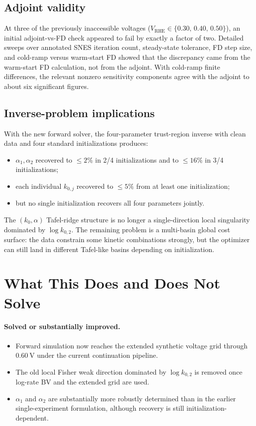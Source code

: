 \documentclass[11pt]{article}
\newcommand{\VRHE}{V_{\mathrm{RHE}}}
\begin{document}
\subsection*{Adjoint validity}
At three of the previously inaccessible voltages ($\VRHE \in
\{0.30,\,0.40,\,0.50\}$), an initial adjoint-vs-FD check appeared to fail by
exactly a factor of two. Detailed sweeps over annotated SNES iteration count,
steady-state tolerance, FD step size, and cold-ramp versus warm-start FD showed
that the discrepancy came from the warm-start FD calculation, not from the
adjoint. With cold-ramp finite differences, the relevant nonzero sensitivity
components agree with the adjoint to about six significant figures.

\subsection*{Inverse-problem implications}
With the new forward solver, the four-parameter trust-region inverse with
clean data and four standard initializations produces:
\begin{itemize}
  \item $\alpha_1, \alpha_2$ recovered to $\le 2\%$ in 2/4 initializations and
        to $\le 16\%$ in 3/4 initializations;
  \item each individual $k_{0,j}$ recovered to $\le 5\%$ from at least one
        initialization;
  \item but no single initialization recovers all four parameters jointly.
\end{itemize}
The $(k_0,\alpha)$ Tafel-ridge structure is no longer a single-direction local
singularity dominated by $\log k_{0,2}$. The remaining problem is a multi-basin
global cost surface: the data constrain some kinetic combinations strongly,
but the optimizer can still land in different Tafel-like basins depending on
initialization.

\section{What This Does and Does Not Solve}
\paragraph{Solved or substantially improved.}
\begin{itemize}
  \item Forward simulation now reaches the extended synthetic voltage grid
        through $\SI{+0.60}{\volt}$ under the current continuation pipeline.
  \item The old local Fisher weak direction dominated by $\log k_{0,2}$ is
        removed once log-rate BV and the extended grid are used.
  \item $\alpha_1$ and $\alpha_2$ are substantially more robustly determined
        than in the earlier single-experiment formulation, although recovery is
        still initialization-dependent.
\end{itemize}
\end{document}
